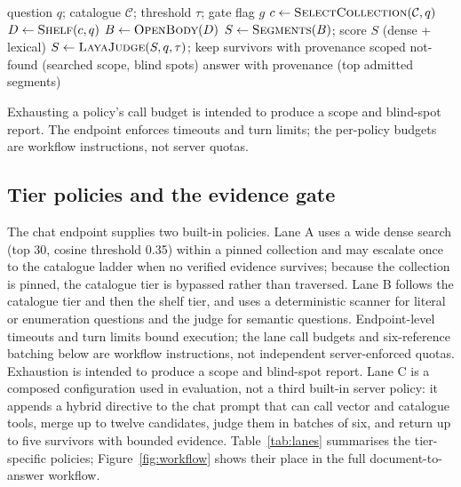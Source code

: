 \begin{algorithm}[t]
\caption{Tiered access with optional evidence gate}
\label{alg:tiered}
\begin{algorithmic}[1]
\Require question $q$; catalogue $\mathcal{C}$; threshold $\tau$; gate flag $g$
\State $c \gets \textsc{SelectCollection}(\mathcal{C}, q)$ 
\State $D \gets \textsc{Shelf}(c, q)$ 
\State $B \gets \textsc{OpenBody}(D)$ 
\State $S \gets \textsc{Segments}(B)$; score $S$ (dense + lexical) 
  \State $S \gets \textsc{LayaJudge}(S, q, \tau)$; keep survivors with provenance
\EndIf
{}
  \State \Return scoped not-found (searched scope, blind spots)
\Else
  \State \Return answer with provenance (top admitted segments)
\EndIf
\end{algorithmic}
\end{algorithm}
Exhausting a policy's call budget is intended to produce a scope and blind-spot
report. The endpoint enforces timeouts and turn limits; the per-policy budgets
are workflow instructions, not server quotas.

\subsection{Tier policies and the evidence gate}
\label{sec:trace}
\label{sec:gate}
\label{sec:gate-primitive}
\label{sec:twostage}

The chat endpoint supplies two built-in policies. Lane A uses a wide dense
search (top 30, cosine threshold 0.35) within a pinned collection and may
escalate once to the catalogue ladder when no verified evidence survives;
because the collection is pinned, the catalogue tier is bypassed rather than
traversed. Lane B follows the catalogue tier and then the shelf tier, and
uses a deterministic scanner for literal or enumeration questions and the
judge for semantic questions. Endpoint-level timeouts and turn limits bound
execution; the lane call budgets and six-reference batching below are workflow
instructions, not independent server-enforced quotas. Exhaustion is intended
to produce a scope and blind-spot report. Lane C is a composed configuration
used in evaluation, not a third built-in server policy: it appends a hybrid
directive to the chat prompt that can call vector and catalogue tools, merge up
to twelve candidates, judge them in batches of six, and return up to five
survivors with bounded evidence. Table~\ref{tab:lanes} summarises the
tier-specific policies; Figure~\ref{fig:workflow} shows their place in the
full document-to-answer workflow.

